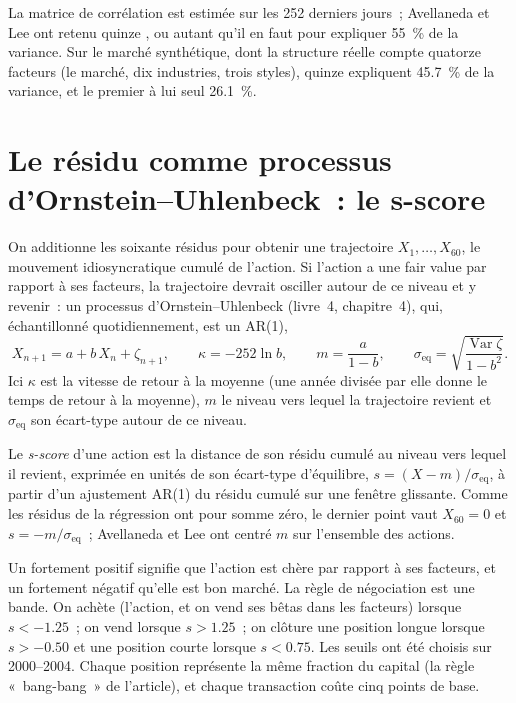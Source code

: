 La matrice de corrélation est estimée sur les 252 derniers jours~; Avellaneda et Lee ont retenu quinze , ou autant qu'il en faut pour expliquer 55~\% de la variance. Sur le
marché synthétique, dont la structure réelle compte quatorze facteurs (le marché, dix industries, trois styles), quinze  expliquent 45.7~\% de la
variance, et le premier à lui seul 26.1~\%.

\section{Le résidu comme processus d'Ornstein--Uhlenbeck~: le s-score}

On additionne les soixante résidus pour obtenir une trajectoire $X_1, \dots, X_{60}$, le mouvement idiosyncratique cumulé de l'action. Si l'action a une fair value par rapport à ses
facteurs, la trajectoire devrait osciller autour de ce niveau et y revenir~: un processus d'Ornstein--Uhlenbeck (livre~4, chapitre~4), qui, échantillonné quotidiennement, est un AR(1),
\[
X_{n+1} = a + b\,X_n + \zeta_{n+1},\qquad \kappa = -252\ln b,\qquad m = \frac{a}{1-b},\qquad \sigma_{\mathrm{eq}} = \sqrt{\frac{\operatorname{Var}\zeta}{1-b^2}}.
\]
Ici $\kappa$ est la vitesse de retour à la moyenne (une année divisée par elle donne le temps de retour à la moyenne), $m$ le niveau vers lequel la trajectoire revient et $\sigma_{\mathrm{eq}}$
son écart-type autour de ce niveau.

\begin{definition}[s-score]\label{def:s1:residual-and-principal-component-stat-arb:sscore}
Le \emph{s-score} d'une action est la distance de son résidu cumulé au niveau vers lequel il revient, exprimée en unités de son
écart-type d'équilibre, $s = (X - m)/\sigma_{\mathrm{eq}}$, à partir d'un ajustement AR(1) du résidu cumulé sur une fenêtre glissante. Comme les résidus de la régression ont pour somme
zéro, le dernier point vaut $X_{60} = 0$ et $s = -m/\sigma_{\mathrm{eq}}$~; Avellaneda et Lee ont centré $m$ sur l'ensemble des actions.
\end{definition}

Un  fortement positif signifie que l'action est chère par rapport à ses facteurs, et un  fortement négatif qu'elle est bon marché. La règle de négociation est une bande. On achète
(l'action, et on vend ses bêtas dans les facteurs) lorsque $s < -1.25$~; on vend lorsque $s > 1.25$~; on clôture une position longue lorsque $s > -0.50$ et une position courte lorsque $s < 0.75$. Les seuils ont été
choisis sur 2000--2004. Chaque position représente la même fraction du capital (la règle «~bang-bang~» de l'article), et chaque transaction coûte cinq points de base.

